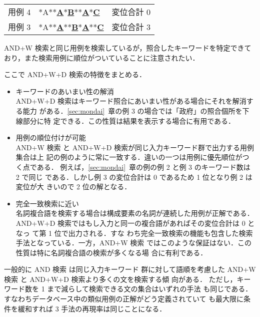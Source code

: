 \begin{center}
\begin{tabular}{lll}
用例 4 & *A**\underline{\bf A}*\underline{\bf B}**\underline{\bf A}*\underline{\bf C} & 変位合計 0\\
用例 3 & *A**\underline{\bf A}**\underline{\bf B}*\underline{\bf A}**\underline{\bf C} & 変位合計 3
\end{tabular}
\end{center}

AND+W 検索と同じ用例を検索しているが，照合したキーワードを特定できて
おり，また検索用例に順位がついていることに注意されたい．

ここで AND+W+D 検索の特徴をまとめる．
\begin{itemize}
\item キーワードのあいまい性の解消\\
AND+W+D 検索はキーワード照合にあいまい性がある場合にそれを解消する能力
がある．\ref{sec:mondai}~章の例 3 の場合では「政府」の照合個所を下線部分に特
定できる．この性質は結果を表示する場合に有用である．
\item 用例の順位付けが可能\\
AND+W 検索 と AND+W+D 検索が同じ入力キーワード群で出力する用例集合は上
記の例のように常に一致する．違いの一つは用例に優先順位がつく点である．
例えば，\ref{sec:mondai}~章の例の例 2 と例 3 のキーワード数は 2 で同じ
である．しかし例 3 の変位合計は 0 であるため 1 位となり例 2 は変位が大
きいので 2 位の解となる．
\item 完全一致検索に近い\\
名詞複合語を検索する場合は構成要素の名詞が連続した用例が正解である．AND+W+D 検索ではもし入力と同一の複合語があればその変位合計は 0 となっ
て第 1 位で出力される．すな
わち完全一致検索の機能も包含した検索手法となっている．一方，AND+W 検索
ではこのような保証はない．この性質は特に名詞複合語の検索が多くなる場
合に有利である．
\end{itemize}

一般的に AND 検索 は同じ入力キーワード
群に対して語順を考慮した AND+W 検索 と AND+W+D 検索より多くの文を検索する傾
向がある．
ただし，キーワード数を 1 まで減らして検索できる文の集合はいずれの手法
も同じである．すなわちデータベース中の類似用例の正解がどう定義されていて
も最大限に条件を緩和すれば 3 手法の再現率は同じことになる．
